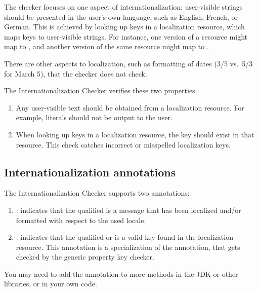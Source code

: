 The checker focuses on one aspect of internationalization:  user-visible strings
should be presented in the user's own language, such as English, French, or
German.  This is achieved by looking up keys in a localization resource,
which maps keys to user-visible strings.  For instance, one version of a
resource might map  to
, and another version of the same resource might map
 to .

There are other aspects to localization, such as formatting of dates (3/5
vs.~5/3 for March 5), that the checker does not check.

The Internationalization Checker verifies these two properties:

\begin{enumerate}

\item
  Any user-visible text should be obtained from a localization resource.
  For example,  literals should not be output to the user.

\item
  When looking up keys in a localization resource, the key should exist in
  that resource.  This check catches incorrect or misspelled localization
  keys.

\end{enumerate}


\subsection{Internationalization annotations\label{i18n-annotations}}

The Internationalization Checker supports two annotations:

\begin{enumerate}
\item {}: indicates that the qualified
 is a message that has been localized and/or formatted with
respect to the used locale.

\item {}: indicates that the
qualified  or  is a valid key found in the
localization resource.
This annotation is a specialization of the  annotation, that
gets checked by the generic property key checker.
\end{enumerate}

You may need to add the  annotation to more methods in the
JDK or other libraries, or in your own code.


